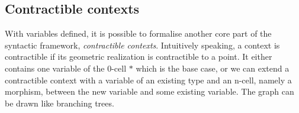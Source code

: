 \documentclass{acm_proc_article-sp}
\begin{document}
\subsection{Contractible contexts}

With variables defined, it is possible to formalise another core part of the syntactic framework, \emph{contractible
contexts}. Intuitively speaking, a context is contractible if its geometric
realization is contractible to a point. It either contains one variable of the 0-cell $*$ which is the base case, or we can extend a contractible context with a
variable of an existing type and an n-cell, namely a morphism, between the new variable and some existing variable. The graph can be drawn like branching trees.

\begin{code}\>\<%
\\
\>  \<%
\\
\>[0]\<[2]%
\>[2] \<[7]%
\>[7]\AgdaSymbol{:}  \AgdaSymbol{(} \AgdaInductiveConstructor{,} \AgdaInductiveConstructor{*}\AgdaSymbol{)}\<%
\\
\>[0]\<[2]%
\>[2] \<[7]%
\>[7]\AgdaSymbol{:} \AgdaSymbol{\}}     \AgdaSymbol{\{} \AgdaSymbol{:}  \AgdaSymbol{\}(} \AgdaSymbol{:}  \AgdaSymbol{)} \<[50]%
\>[50]\<%
\\
\>[2]\<[7]%
\>[7]  \AgdaSymbol{(} \AgdaInductiveConstructor{,}  \AgdaInductiveConstructor{,} \AgdaSymbol{(} \AgdaSymbol{(} \AgdaSymbol{)}   \AgdaSymbol{))} \<[54]%
\>[54]\<%
\\
\>\<\end{code}
\end{document}
